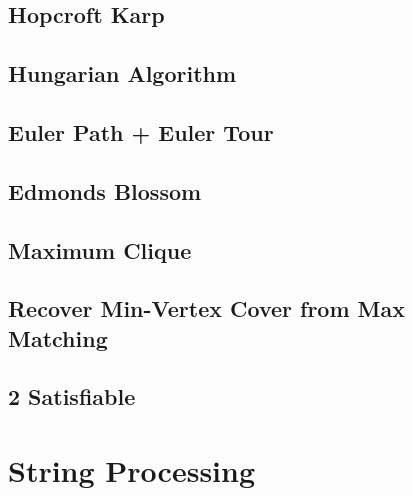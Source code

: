 \subsection{Hopcroft Karp}



\subsection{Hungarian Algorithm}


\subsection{Euler Path + Euler Tour}


\subsection{Edmonds Blossom}


\subsection{Maximum Clique}



\subsection{Recover Min-Vertex Cover from Max Matching}



\subsection{2 Satisfiable}


\section{String Processing}

